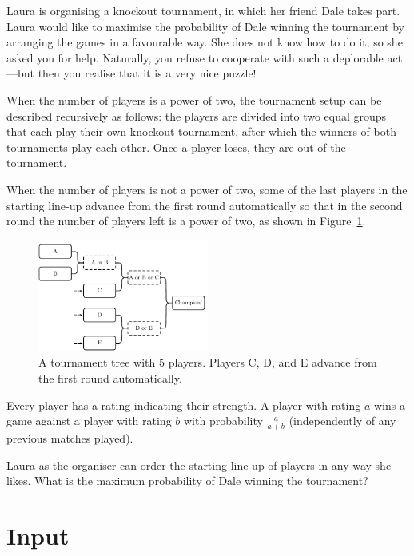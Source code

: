 
Laura is organising a knockout tournament, in which her friend Dale takes part.
Laura would like to maximise the probability of Dale winning the tournament by
arranging the games in a favourable way. She does not know how to do it, so she
asked you for help. Naturally, you refuse to cooperate with such a deplorable
act---but then you realise that it is a very nice puzzle!

When the number of players is a power of two, the tournament setup can be
described recursively as follows: the players are divided into two equal groups
that each play their own knockout tournament, after which the winners of both
tournaments play each other. Once a player loses, they are out of the
tournament.

When the number of players is not a power of two, some of the last players in
the starting line-up advance from the first round automatically so that in the
second round the number of players left is a power of two, as shown in
Figure~\ref{fig:knockout}.

\begin{figure}[h!]
  \centering
  \includegraphics[width=0.5\textwidth]{sample2}
  \caption{A tournament tree with $5$ players.  Players C, D, and E advance from the first round automatically.}
  \label{fig:knockout}
\end{figure}

Every player has a rating indicating their strength.
A player with rating $a$ wins a game against a player with rating $b$ with
probability $\frac{a}{a+b}$ (independently of any previous matches played).

Laura as the organiser can order the starting line-up of players in any way she
likes. What is the maximum probability of Dale winning the tournament?


\section*{Input}

